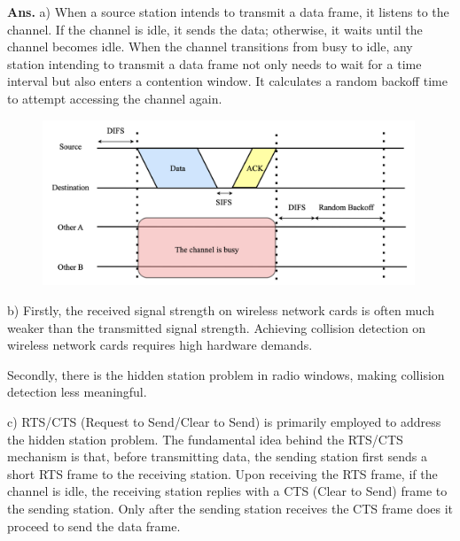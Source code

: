 \documentclass[12pt, a4paper, UTF8, fontset=windows]{ctexbook}
\newenvironment{solution}{\par\noindent\textbf{Ans.}}{\par}
\begin{document}
\begin{solution}
    a)
    When a source station intends to transmit a data frame, it listens to the channel. If the channel is idle, 
    it sends the data; otherwise, it waits until the channel becomes idle. When the channel transitions from busy to idle, 
    any station intending to transmit a data frame not only needs to wait for a time interval but also enters a contention window. 
    It calculates a random backoff time to attempt accessing the channel again.
    
    \begin{figure}[H]
        \centering
        \includegraphics[width=0.99\textwidth]{../src/Q2-a.png}
    \end{figure}

    b)
    Firstly, the received signal strength on wireless network cards is often much weaker than the transmitted signal strength. Achieving collision detection on wireless network cards requires high hardware demands. 
    
    Secondly, there is the hidden station problem in radio windows, making collision detection less meaningful.

    c)
    RTS/CTS (Request to Send/Clear to Send) is primarily employed to address the hidden station problem. The fundamental idea behind the RTS/CTS mechanism is that, before transmitting data, the sending station first sends a short RTS frame to the receiving station. Upon receiving the RTS frame, if the channel is idle, the receiving station replies with a CTS (Clear to Send) frame to the sending station. Only after the sending station receives the CTS frame does it proceed to send the data frame.


\end{solution}
\end{document}
